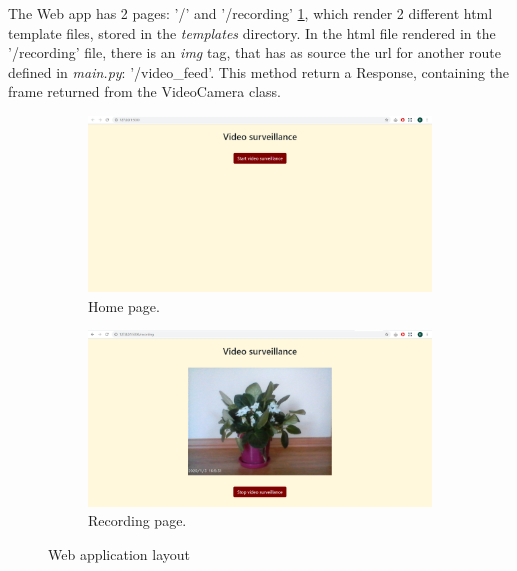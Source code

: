 \documentclass[a4paper,12pt]{report}
\begin{document}
The Web app has 2 pages: '/' and '/recording' \ref{fig:pic2}, which render 2 different html template files, stored in the \textit{templates} directory. In the html file rendered in the '/recording' file, there is an \textit{img} tag, that has as source the url for another route defined in \textit{main.py}: '/video\_feed'. This method return a Response, containing the frame returned from the VideoCamera class.


\vspace{0.5cm}
\begin{figure}[h!]
  \centering
  \begin{subfigure}[b]{0.4\linewidth}
    \includegraphics[width=\linewidth]{fig/site1.png}
    \caption{Home page.}
  \end{subfigure}
\hspace{0.5cm}
  \begin{subfigure}[b]{0.4\linewidth}
    \includegraphics[width=\linewidth]{fig/site2.png}
    \caption{Recording page.}
  \end{subfigure}
  \caption{Web application layout}
  \label{fig:pic2}
\end{figure}

\vspace{0.5cm}
\end{document}
